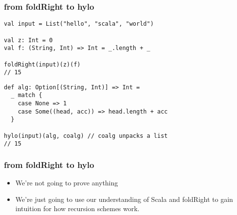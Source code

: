 \documentclass[include/preamble.tex]{subfiles}
\begin{document}
\begin{frame}[fragile]
  \frametitle{from foldRight to hylo}
  \begin{center}
    \begin{lstlisting}[style=scala]
val input = List("hello", "scala", "world")

val z: Int = 0
val f: (String, Int) => Int = _.length + _

foldRight(input)(z)(f)
// 15
    \end{lstlisting}
    \pause
    \hrulefill
    \begin{lstlisting}[style=scala]
def alg: Option[(String, Int)] => Int =
  _ match {
    case None => 1
    case Some((head, acc)) => head.length + acc
  }

hylo(input)(alg, coalg) // coalg unpacks a list
// 15
    \end{lstlisting}
  \end{center}
\end{frame}

\begin{frame}[fragile]
  \frametitle{from foldRight to hylo}
  \begin{center}
    \begin{itemize}
    \item
      We're not going to prove anything
    \item
      We're just going to use our understanding of Scala and
      foldRight to gain intuition for how recursion schemes work.
    \end{itemize}
  \end{center}
\end{frame}
\end{document}

